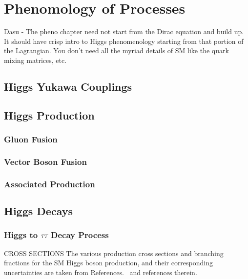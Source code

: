 \chapter{Phenomology of Processes}
\label{sec:pheno}

Dasu -
The pheno chapter need not start from the Dirac equation and build up. It should have crisp intro to Higgs phenomenology starting from that portion of the Lagrangian. You don’t need all the myriad details of SM like the quark mixing matrices, etc.

\section{Higgs Yukawa Couplings}

\section{Higgs Production}

\subsection{Gluon Fusion}

\subsection{Vector Boson Fusion}

\subsection{Associated Production}

\section{Higgs Decays}

\subsection{Higgs to $\tau\tau$ Decay Process}

CROSS SECTIONS
The various production cross sections and branching fractions for the SM Higgs 
boson production, and their corresponding uncertainties are taken from 
References.~\cite{deFlorian:2016spz,Denner:2011mq,Ball:2011mu} and references therein.
